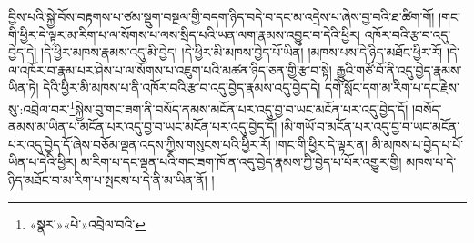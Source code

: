 བྱིས་པའི་སྐྱེ་བོས་བརྟགས་པ་ཙམ་སྡུག་བསྔལ་གྱི་བདག་ཉིད་བདེ་བ་དང་མ་འདྲེས་པ་ཞེས་བྱ་བའི་ཐ་ཚིག་གོ། །གང་གི་ཕྱིར་དེ་ལྟར་མ་རིག་པ་ལ་སོགས་པ་ལས་སྲིད་པའི་ཡན་ལག་རྣམས་འབྱུང་བ་དེའི་ཕྱིར། འཁོར་བའི་རྩ་བ་འདུ་བྱེད་དེ། །དེ་ཕྱིར་མཁས་རྣམས་འདུ་མི་བྱེད། །དེ་ཕྱིར་མི་མཁས་བྱེད་པོ་ཡིན། །མཁས་པས་དེ་ཉིད་མཐོང་ཕྱིར་རོ། །དེ་ལ་འཁོར་བ་རྣམ་པར་ཤེས་པ་ལ་སོགས་པ་འཇུག་པའི་མཚན་ཉིད་ཅན་གྱི་རྩ་བ་སྟེ། རྒྱུའི་གཙོ་བོ་ནི་འདུ་བྱེད་རྣམས་ཡིན་ཏེ། དེའི་ཕྱིར་མི་མཁས་པ་ནི་འཁོར་བའི་རྩ་བ་འདུ་བྱེད་རྣམས་འདུ་བྱེད་དེ། དགེ་སློང་དག་མ་རིག་པ་དང་རྗེས་སུ་:འབྲེལ་བར་\footnote{«སྣར་»«པེ་»འབྲེལ་བའི་}སྐྱེས་བུ་གང་ཟག་ནི་བསོད་ནམས་མངོན་པར་འདུ་བྱ་བ་ཡང་མངོན་པར་འདུ་བྱེད་དོ། །བསོད་ནམས་མ་ཡིན་པ་མངོན་པར་འདུ་བྱ་བ་ཡང་མངོན་པར་འདུ་བྱེད་དོ། །མི་གཡོ་བ་མངོན་པར་འདུ་བྱ་བ་ཡང་མངོན་པར་འདུ་བྱེད་དོ་ཞེས་བཅོམ་ལྡན་འདས་ཀྱིས་གསུངས་པའི་ཕྱིར་རོ། །གང་གི་ཕྱིར་དེ་ལྟར་ན། མི་མཁས་པ་བྱེད་པ་པོ་ཡིན་པ་དེའི་ཕྱིར། མ་རིག་པ་དང་ལྡན་པའི་གང་ཟག་ཁོ་ན་འདུ་བྱེད་རྣམས་ཀྱི་བྱེད་པ་པོར་འགྱུར་གྱི། མཁས་པ་དེ་ཉིད་མཐོང་བ་མ་རིག་པ་སྤངས་པ་དེ་ནི་མ་ཡིན་ནོ། །
